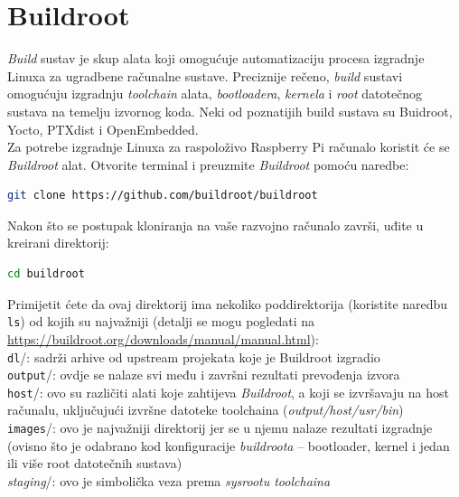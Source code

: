 \documentclass[11pt]{article}
\begin{document}
\section{Buildroot}
\textit{Build} sustav je skup alata koji omogućuje automatizaciju procesa
 izgradnje Linuxa za ugradbene računalne sustave. Preciznije rečeno,
 \textit{build} sustavi omogućuju izgradnju \textit{toolchain} alata,
 \textit{bootloadera}, \textit{kernela} i \textit{root} datotečnog sustava na
 temelju izvornog koda. Neki od poznatijih build sustava su Buidroot, Yocto,
 PTXdist i OpenEmbedded. \\
\newline
Za potrebe izgradnje Linuxa za raspoloživo Raspberry Pi računalo koristit će se
 \textit{Buildroot} alat. Otvorite terminal i preuzmite \textit{Buildroot}
 pomoću naredbe:
\begin{lstlisting}[language=bash]
git clone https://github.com/buildroot/buildroot
\end{lstlisting}
Nakon što se postupak kloniranja na vaše razvojno računalo završi, uđite u
 kreirani direktorij:
\begin{lstlisting}[language=bash]
cd buildroot
\end{lstlisting}
Primijetit ćete da ovaj direktorij ima nekoliko poddirektorija (koristite
 naredbu \texttt{ls}) od kojih su najvažniji (detalji se mogu pogledati na\\
 \url{https://buildroot.org/downloads/manual/manual.html}):\\
\newline
 \texttt{dl}/: sadrži arhive od upstream projekata koje je Buildroot izgradio\\
\newline
 \texttt{output}/: ovdje se nalaze svi među i završni rezultati prevođenja
 izvora\\
\newline
\texttt{host}/: ovo su različiti alati koje zahtijeva \textit{Buildroot}, a
 koji se izvršavaju na host računalu, uključujući izvršne datoteke
 toolchaina (\textit{output/host/usr/bin})\\
\newline
\texttt{images}/: ovo je najvažniji direktorij jer se u njemu nalaze rezultati
izgradnje (ovisno što je odabrano kod konfiguracije \textit{buildroota} –
 bootloader, kernel i jedan ili više root datotečnih sustava)\\
\newline
\textit{staging}/: ovo je simbolička veza prema \textit{sysrootu toolchaina}\\
\end{document}
